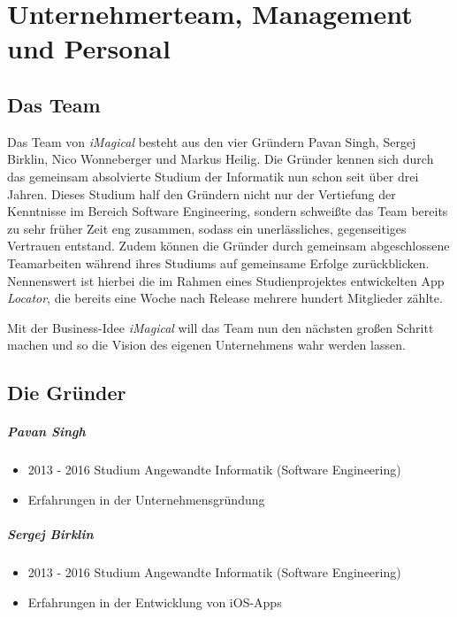 \chapter{Unternehmerteam, Management und Personal}


\section{Das Team}

Das Team von \textit{iMagical} besteht aus den vier Gründern Pavan Singh, Sergej Birklin, Nico Wonneberger und Markus Heilig.
Die Gründer kennen sich durch das gemeinsam absolvierte Studium der Informatik nun schon seit über drei Jahren.
Dieses Studium half den Gründern nicht nur der Vertiefung der Kenntnisse im Bereich Software Engineering, sondern schweißte das Team bereits zu sehr früher Zeit eng zusammen, sodass ein unerlässliches, gegenseitiges Vertrauen entstand.
Zudem können die Gründer durch gemeinsam abgeschlossene Teamarbeiten während ihres Studiums auf gemeinsame Erfolge zurückblicken.
Nennenswert ist hierbei die im Rahmen eines Studienprojektes entwickelten App \textit{Locator}, die bereits eine Woche nach Release mehrere hundert Mitglieder zählte.

Mit der Business-Idee \textit{iMagical} will das Team nun den nächsten großen Schritt machen und so die Vision des eigenen Unternehmens wahr werden lassen.


\section{Die Gründer}


\paragraph{Pavan Singh}
\begin{itemize}
\item 2013 - 2016 Studium Angewandte Informatik (Software Engineering)
\item Erfahrungen in der Unternehmensgründung
\end{itemize}

\paragraph{Sergej Birklin}
\begin{itemize}
\item 2013 - 2016 Studium Angewandte Informatik (Software Engineering)
\item Erfahrungen in der Entwicklung von iOS-Apps
\end{itemize}

